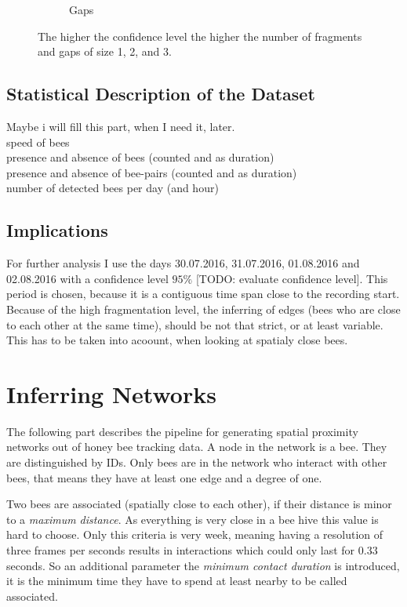 \begin{figure}
\begin{subfigure}[b]{0.45\textwidth}
        \caption[Average Number of Gaps]{Gaps}
        \label{fig:gaps}
    \end{subfigure}
    \caption{The higher the confidence level the higher the number of fragments and gaps of size 1, 2, and 3.}
    \label{fig:animals}
\end{figure}


\subsection{Statistical Description of the Dataset}
Maybe i will fill this part, when I need it, later.\\
speed of bees\\
presence and absence of bees (counted and as duration)\\
presence and absence of bee-pairs (counted and as duration)\\
number of detected bees per day (and hour)\\ 


\subsection{Implications}
For further analysis I use the days 30.07.2016, 31.07.2016, 01.08.2016 and 02.08.2016 with a confidence level $95\%$ [TODO: evaluate confidence level]. This period is chosen, because it is a contiguous time span close to the recording start.
Because of the high fragmentation level, the inferring of edges (bees who are close to each other at the same time), should be not that strict, or at least variable. This has to be taken into acoount, when looking at spatialy close bees.


\section{Inferring Networks}

The following part describes the pipeline for generating spatial proximity networks out of honey bee tracking data. A node in the network is a bee. They are distinguished by IDs. Only bees are in the network who interact with other bees, that means they have at least one edge and a degree of one.

Two bees are associated (spatially close to each other), if their distance is minor to a \emph{maximum distance}. As everything is very close in a bee hive this value is hard to choose. Only this criteria is very week, meaning having a resolution of three frames per seconds results in interactions which could only last for $0.33$ seconds. So an additional parameter the \emph{minimum contact duration} is introduced, it is the minimum time they have to spend at least nearby to be called associated.

